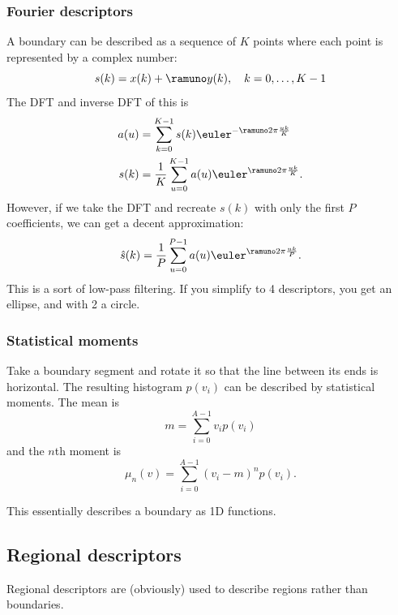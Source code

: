 \subsubsection{Fourier descriptors}
A boundary can be described as a sequence of $K$ points where each point is represented by a complex number:
\begin{equation}
    s(k) = x(k) + \ramuno y(k), \quad k = 0, \dots, K-1
\end{equation}
The DFT and inverse DFT of this is
\begin{equation}
\begin{split}
    a(u) &= \sum_{k=0}^{K-1} s(k) \euler^{- \ramuno 2 \pi \frac{uk}{K}} \\
    s(k) &= \frac{1}{K} \sum_{u=0}^{K-1} a(u) \euler^{\ramuno 2 \pi \frac{uk}{K}}.
\end{split}
\end{equation}
However, if we take the DFT and recreate $s(k)$ with only the first $P$ coefficients, we can get a decent approximation:
\begin{equation}
    \hat{s}(k) = \frac{1}{P} \sum_{u=0}^{P-1} a(u) \euler^{\ramuno 2 \pi \frac{uk}{P}}.
\end{equation}
This is a sort of low-pass filtering. If you simplify to 4 descriptors, you get an ellipse, and with 2 a circle.

\subsubsection{Statistical moments}
Take a boundary segment and rotate it so that the line between its ends is horizontal. The resulting histogram $p(v_i)$ can be described by statistical moments. The mean is
\begin{equation}
    m = \sum_{i=0}^{A-1} v_i p(v_i)
\end{equation}
and the $n$th moment is
\begin{equation}\label{eq:nth-moment}
    \mu_n(v) = \sum_{i=0}^{A-1} (v_i - m)^n p(v_i).
\end{equation}

This essentially describes a boundary as 1D functions.

\subsection{Regional descriptors}
Regional descriptors are (obviously) used to describe regions rather than boundaries.

